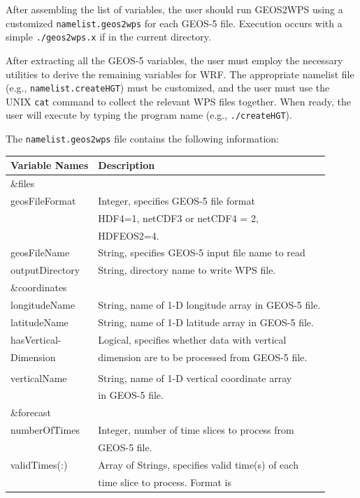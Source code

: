 After assembling the list of variables, the user should run GEOS2WPS using
a customized \texttt{namelist.geos2wps} for each GEOS-5 file. Execution occurs
with a simple \texttt{./geos2wps.x} if in the current directory.

After extracting all the GEOS-5 variables, the user must employ the necessary
utilities to derive the remaining variables for WRF. The appropriate namelist
file (e.g., \texttt{namelist.createHGT}) must be customized, and the user must
use the UNIX \texttt{cat} command to collect the relevant WPS files together.
When ready, the user will execute by typing the program name (e.g., 
\texttt{./createHGT}).

\newpage
The \texttt{namelist.geos2wps} file contains the following information:

\begin{tabular}{|l|l|} \hline
Variable Names & Description \\ \hline
\&files          & \\ \hline
geosFileFormat & Integer, specifies GEOS-5 file format \\
 & HDF4=1, netCDF3 or netCDF4 = 2, \\
 & HDFEOS2=4. \\ \hline
geosFileName & String, specifies GEOS-5 input file name to read \\ 
outputDirectory & String, directory name to write WPS file. \\  \hline
\&coordinates & \\ \hline
longitudeName & String, name of 1-D longitude array in GEOS-5 file. \\ \hline
latitudeName & String, name of 1-D latitude array in GEOS-5 file. \\ \hline
hasVertical- & Logical, specifies whether data with vertical \\
Dimension & dimension are to be processed from GEOS-5 file. \\ \hline
 & \\
verticalName & String, name of 1-D vertical coordinate array \\ 
& in GEOS-5 file. \\ \hline
\&forecast & \\ \hline
numberOfTimes & Integer, number of time slices to process from\\
& GEOS-5 file. \\ \hline
validTimes(:) & Array of Strings, specifies valid time(s) of each \\
&time slice to process. Format is \\ 

\end{tabular}
